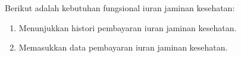 Berikut adalah kebutuhan fungsional iuran jaminan kesehatan:
\begin{enumerate}
	\item Menunjukkan histori pembayaran iuran jaminan kesehatan.
	\item Memasukkan data pembayaran iuran jaminan kesehatan.
\end{enumerate}